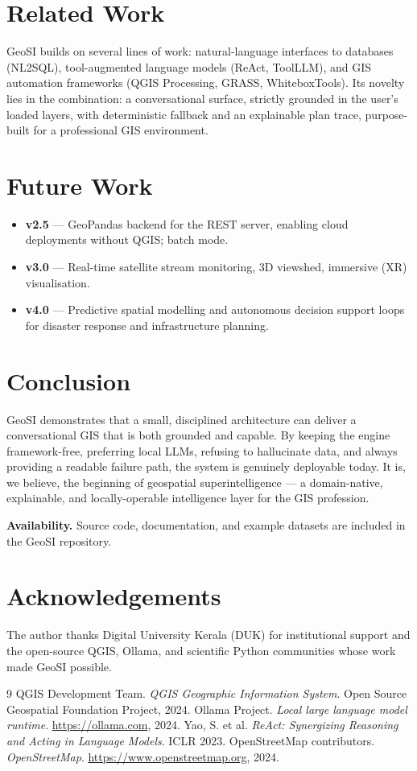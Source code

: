 \documentclass[11pt,a4paper]{article}
\begin{document}
\section{Related Work}
GeoSI builds on several lines of work: natural-language interfaces to
databases (NL2SQL), tool-augmented language models (ReAct, ToolLLM),
and GIS automation frameworks (QGIS Processing, GRASS, WhiteboxTools).
Its novelty lies in the combination: a conversational surface,
strictly grounded in the user's loaded layers, with deterministic
fallback and an explainable plan trace, purpose-built for a
professional GIS environment.

\section{Future Work}
\begin{itemize}[leftmargin=*]
  \item \textbf{v2.5} --- GeoPandas backend for the REST server,
  enabling cloud deployments without QGIS; batch mode.
  \item \textbf{v3.0} --- Real-time satellite stream monitoring, 3D
  viewshed, immersive (XR) visualisation.
  \item \textbf{v4.0} --- Predictive spatial modelling and autonomous
  decision support loops for disaster response and infrastructure
  planning.
\end{itemize}

\section{Conclusion}
GeoSI demonstrates that a small, disciplined architecture can
deliver a conversational GIS that is both grounded and capable. By
keeping the engine framework-free, preferring local LLMs, refusing to
hallucinate data, and always providing a readable failure path, the
system is genuinely deployable today. It is, we believe, the
beginning of geospatial superintelligence --- a domain-native,
explainable, and locally-operable intelligence layer for the GIS
profession.

\vspace{1em}
\noindent\textbf{Availability.} Source code, documentation, and
example datasets are included in the GeoSI repository.

\section*{Acknowledgements}
The author thanks Digital University Kerala (DUK) for institutional
support and the open-source QGIS, Ollama, and scientific Python
communities whose work made GeoSI possible.

\begin{thebibliography}{9}
 QGIS Development Team. \emph{QGIS Geographic Information
System}. Open Source Geospatial Foundation Project, 2024.
 Ollama Project. \emph{Local large language model
runtime}. \url{https://ollama.com}, 2024.
 Yao, S. et al. \emph{ReAct: Synergizing Reasoning and
Acting in Language Models}. ICLR 2023.
 OpenStreetMap contributors. \emph{OpenStreetMap}.
\url{https://www.openstreetmap.org}, 2024.
\end{thebibliography}
\end{document}
